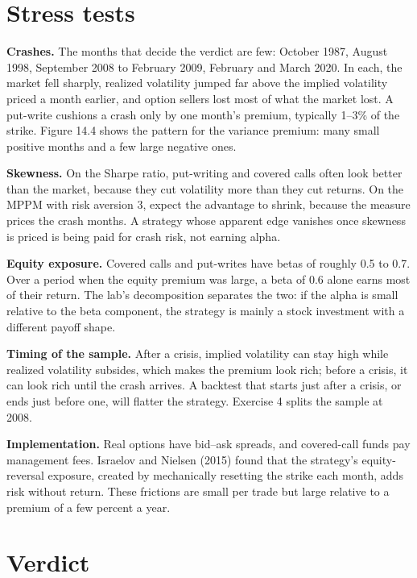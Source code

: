 \section{Stress tests}
\label{sec:14-stress}

\textbf{Crashes.} The months that decide the verdict are few: October 1987, August 1998, September 2008 to February 2009, February and March 2020. In each, the market fell sharply, realized volatility jumped far above the implied volatility priced a month earlier, and option sellers lost most of what the market lost. A put-write cushions a crash only by one month's premium, typically 1--3\% of the strike. Figure 14.4 shows the pattern for the variance premium: many small positive months and a few large negative ones.

\textbf{Skewness.} On the Sharpe ratio, put-writing and covered calls often look better than the market, because they cut volatility more than they cut returns. On the MPPM with risk aversion 3, expect the advantage to shrink, because the measure prices the crash months. A strategy whose apparent edge vanishes once skewness is priced is being paid for crash risk, not earning alpha.

\textbf{Equity exposure.} Covered calls and put-writes have betas of roughly 0.5 to 0.7. Over a period when the equity premium was large, a beta of 0.6 alone earns most of their return. The lab's decomposition separates the two: if the alpha is small relative to the beta component, the strategy is mainly a stock investment with a different payoff shape.

\textbf{Timing of the sample.} After a crisis, implied volatility can stay high while realized volatility subsides, which makes the premium look rich; before a crisis, it can look rich until the crash arrives. A backtest that starts just after a crisis, or ends just before one, will flatter the strategy. Exercise 4 splits the sample at 2008.

\textbf{Implementation.} Real options have bid--ask spreads, and covered-call funds pay management fees. Israelov and Nielsen (2015) found that the strategy's equity-reversal exposure, created by mechanically resetting the strike each month, adds risk without return. These frictions are small per trade but large relative to a premium of a few percent a year.

\section{Verdict}
\label{sec:14-verdict}

